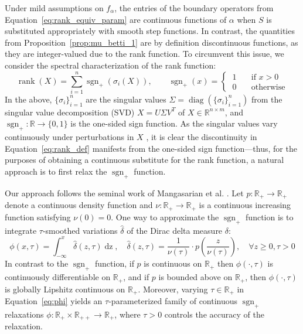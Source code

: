 \documentclass[pdflatex,sn-mathphys-num]{sn-jnl}
\begin{document}
Under mild assumptions on \(f_{\alpha}\), the entries of the boundary operators from Equation~\ref{eq:rank_equiv_param} are continuous functions of \(\alpha\) when \(S\) is substituted appropriately with smooth step functions. In contrast, the quantities from Proposition~\ref{prop:mu_betti_1} are by definition discontinuous functions, as they are integer-valued due to the rank function. To circumvent this issue, we consider the spectral characterization of the rank function:
\[\label{eq:rank_def}
\operatorname{rank}(X) = \sum_{i = 1}^{n}\operatorname{sgn}_{+}\left( \sigma_{i}(X) \right),\quad\quad\operatorname{sgn}_{+}(x) = \begin{cases}
\: 1 & \quad\text{if }x > 0 \\
\: 0 & \quad\text{otherwise}
\end{cases}
\]
In the above, \(\{\sigma_{i}\}_{i = 1}^{n}\) are the singular values \(\Sigma = \operatorname{diag} \left( \{\sigma_{i}\}_{i = 1}^{n} \right) \) from the singular value decomposition (SVD) \(X = U\Sigma V^{T}\) of \(X \in \mathbb{R}^{n \times m}\), and \(\operatorname{sgn}_{+}:\mathbb{R} \rightarrow \{ 0,1\}\) is the one-sided sign function. As the singular values vary continuously under perturbations in \(X\) \cite{bhatia2013matrix}, it is clear the discontinuity in Equation~\ref{eq:rank_def} manifests from the one-sided sign function---thus, for the purposes of obtaining a continuous substitute for the rank function, a natural approach is to first relax the \(\operatorname{sgn}_{+}\) function.

Our approach follows the seminal work of Mangasarian et al. \cite{mangasarian1994class}. Let \(p:\mathbb{R}_{+} \rightarrow \mathbb{R}_{+}\) denote a continuous density function and \(\nu:\mathbb{R}_{+} \rightarrow \mathbb{R}_{+}\) is a continuous increasing function satisfying \(\nu(0) = 0\). One way to approximate the \(\operatorname{sgn}_{+}\) function is to integrate \(\tau\)-smoothed variations \(\hat{\delta}\) of the Dirac delta measure \(\delta\):
\[\label{eq:phi}
\phi(x,\tau) = \int_{- \infty}^{x}\hat{\delta}(z,\tau)\operatorname{dz},\quad\hat{\delta}(z,\tau) = \frac{1}{\nu(\tau)} \cdot p\left( \frac{z}{\nu(\tau)} \right),\quad\forall z \geq 0,\tau > 0
\]
In contrast to the \(\operatorname{sgn}_{+}\) function, if \(p\) is continuous on \(\mathbb{R}_{+}\) then \(\phi ( \cdot ,\tau) \) is continuously differentiable on \(\mathbb{R}_{+}\), and if \(p\) is bounded above on \(\mathbb{R}_{+}\), then \(\phi ( \cdot ,\tau) \) is globally Lipshitz continuous on \(\mathbb{R}_{+}\). Moreover, varying \(\tau \in \mathbb{R}_{+}\) in Equation~\ref{eq:phi} yields an \(\tau\)-parameterized family of continuous \(\operatorname{sgn}_{+}\) relaxations \(\phi:\mathbb{R}_{+} \times \mathbb{R}_{+ +} \rightarrow \mathbb{R}_{+}\), where \(\tau > 0\) controls the accuracy of the relaxation.
\end{document}
